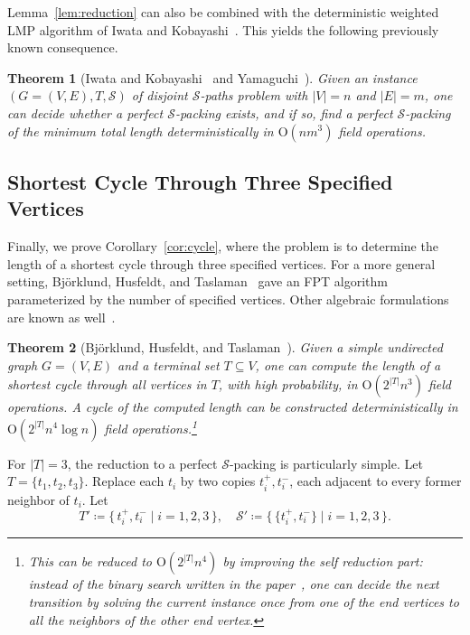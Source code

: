 \documentclass[11pt, a4paper]{article}
\theoremstyle{plain}
\newtheorem{theorem}{Theorem}[section]
\theoremstyle{definition}
\theoremstyle{remark}
\newcommand{\cS}{\mathcal{S}}
\begin{document}
Lemma~\ref{lem:reduction} can also be combined with the deterministic weighted LMP algorithm of Iwata and Kobayashi~\cite{IK2022}.
This yields the following previously known consequence.

\begin{theorem}[Iwata and Kobayashi~\cite{IK2022} and Yamaguchi~\cite{Yamaguchi2016}]\label{thm:S-packing_deterministic}
Given an instance $(G=(V,E), T, \cS)$ of disjoint $\cS$-paths problem with $|V| = n$ and $|E| = m$, one can decide whether a perfect $\cS$-packing exists, and if so, find a perfect $\cS$-packing of the minimum total length deterministically in $\mathrm{O}(nm^3)$ field operations.
\end{theorem}



\subsection{Shortest Cycle Through Three Specified Vertices}
Finally, we prove Corollary~\ref{cor:cycle}, where the problem is to determine the length of a shortest cycle through three specified vertices.
For a more general setting, Björklund, Husfeldt, and Taslaman~\cite{BHT2012} gave an FPT algorithm parameterized by the number of specified vertices.
Other algebraic formulations are known as well~\cite{Wahlstrom2013,EKW2024,EibenKoanaWahlstrom2025}.

\begin{theorem}[Björklund, Husfeldt, and Taslaman~\cite{BHT2012}]
Given a simple undirected graph $G=(V,E)$ and a terminal set $T\subseteq V$, one can compute the length of a shortest cycle through all vertices in $T$, with high probability, in $\mathrm{O}(2^{|T|}n^3)$ field operations.
A cycle of the computed length can be constructed deterministically in $\mathrm{O}(2^{|T|}n^4\log n)$ field operations.\footnote{This can be reduced to $\mathrm{O}(2^{|T|}n^4)$ by improving the self reduction part: instead of the binary search written in the paper~\cite{BHT2012}, one can decide the next transition by solving the current instance once from one of the end vertices to all the neighbors of the other end vertex.}
\end{theorem}

For $|T|=3$, the reduction to a perfect $\cS$-packing is particularly simple.
Let $T=\{t_1,t_2,t_3\}$.
Replace each $t_i$ by two copies $t_i^+,t_i^-$, each adjacent to every former neighbor of $t_i$.
Let
\[T'\coloneqq\{\, t_i^+,t_i^- \mid i=1,2,3 \,\}, \quad \cS'\coloneqq\{\,\{t_i^+,t_i^-\} \mid i=1,2,3\,\}.\]
\end{document}
